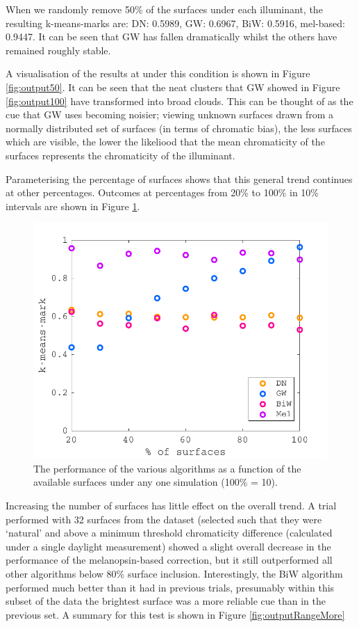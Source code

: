 When we randomly remove 50\% of the surfaces under each illuminant, the resulting k-means-marks are: \gls{DN}: 0.5989, \gls{GW}: 0.6967, \gls{BiW}: 0.5916, mel-based: 0.9447. It can be seen that \gls{GW} has fallen dramatically whilst the others have remained roughly stable. 

A visualisation of the results at under this condition is shown in Figure \ref{fig:output50}. It can be seen that the neat clusters that \gls{GW} showed in Figure \ref{fig:output100} have transformed into broad clouds. This can be thought of as the cue that \gls{GW} uses becoming noisier; viewing unknown surfaces drawn from a normally distributed set of surfaces (in terms of chromatic bias), the less surfaces which are visible, the lower the likeliood that the mean chromaticity of the surfaces represents the chromaticity of the illuminant. 

Parameterising the percentage of surfaces shows that this general trend continues at other percentages. Outcomes at percentages from 20\% to 100\% in 10\% intervals are shown in Figure \ref{fig:outputRange}.

\begin{figure}[htbp]
 \includegraphics[max width=\textwidth]{figs/comp/comparisonFourAlgos/outputRange.pdf}
 \caption{The performance of the various algorithms as a function of the available surfaces under any one simulation (100\% = 10).}
 \label{fig:outputRange}
\end{figure} 

Increasing the number of surfaces has little effect on the overall trend. A trial performed with 32 surfaces from the \citet{vrhel_measurement_1994} dataset (selected such that they were `natural' and above a minimum threshold chromaticity difference (calculated under a single daylight measurement) showed a slight overall decrease in the performance of the melanopsin-based correction, but it still outperformed all other algorithms below 80\% surface inclusion. Interestingly, the \gls{BiW} algorithm performed much better than it had in previous trials, presumably within this subset of the data the brightest surface was a more reliable cue than in the previous set. A summary for this test is shown in Figure \ref{fig:outputRangeMore}


